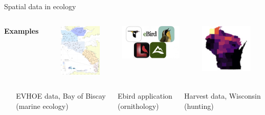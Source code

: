 \documentclass[
  10pt,
  ignorenonframetext,
]{beamer}
\begin{document}
\begin{frame}{Spatial data in ecology}
\begin{columns}
\begin{column}{0.1\textwidth}
\center \footnotesize {\bf Examples}
\end{column}
\begin{column}{0.3\textwidth}
\center
\includegraphics[width=2cm]{images/EVHOE_stations.jpg}
\end{column}
\begin{column}{0.3\textwidth}
\center
\includegraphics[width=3cm]{images/bird_apps.jpg}
\end{column}
\begin{column}{0.3\textwidth}
\center
\includegraphics[width=2.5cm]{images/harvest_picture.PNG}
\end{column}
\end{columns}

\begin{columns}
\begin{column}{0.1\textwidth}
\end{column}
\begin{column}{0.3\textwidth}
\center \scriptsize
EVHOE data, Bay of Biscay \\ (marine ecology)
\end{column}
\begin{column}{0.3\textwidth}
\center \scriptsize
Ebird application \\ (ornithology)
\end{column}
\begin{column}{0.3\textwidth}
\center \scriptsize
Harvest data, Wisconsin \\ (hunting)
\end{column}
\end{columns}

\end{frame}
\end{document}
